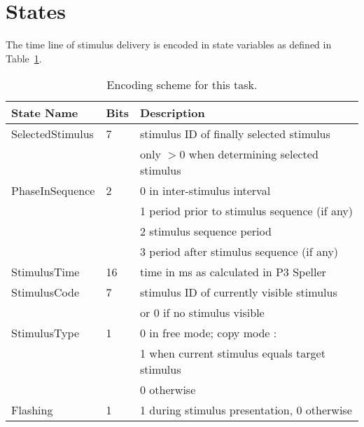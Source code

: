 \documentclass[letterpaper,oneside,12pt]{article}
\begin{document}
\section{States}

The time line of stimulus delivery is encoded in state variables as defined in
Table~\ref{tab:states}.
\begin{table}
\begin{center}
\begin{tabular}[ht]{|l|l|l|}
\hline
\bf{State Name}& \bf{Bits}            & \bf{Description} \\
\hline
\hline
 SelectedStimulus & 7 & stimulus ID of finally selected stimulus \\
                  &   & only $>$0 when determining selected stimulus\\
\hline
 PhaseInSequence  & 2 & 0 in inter-stimulus interval\\
                  &   & 1 period prior to stimulus sequence (if any)\\
                  &   & 2 stimulus sequence period\\
                  &   & 3 period after stimulus sequence (if any)\\
\hline
 StimulusTime     & 16& time in ms as calculated in P3 Speller\\
\hline
 StimulusCode     & 7 & stimulus ID of currently visible stimulus\\
                  &   & or 0 if no stimulus visible\\
\hline
 StimulusType     & 1 & 0 in free mode; copy mode :\\
                  &   & 1 when current stimulus equals target stimulus\\
                  &   & 0 otherwise\\
\hline
 Flashing         & 1 & 1 during stimulus presentation, 0 otherwise\\
\hline
\end{tabular}
\caption{Encoding scheme for this task.}
\label{tab:states}
\end{center}
\end{table}

\end{document}
